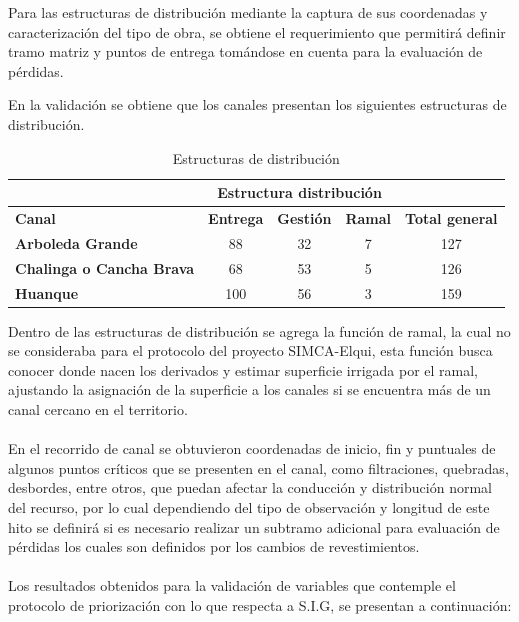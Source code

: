 \documentclass[]{article}
\begin{document}
Para las estructuras de distribución mediante la captura de sus coordenadas y caracterización del tipo de obra, se obtiene el requerimiento que permitirá definir tramo matriz y puntos de entrega tomándose en cuenta para la evaluación de pérdidas. 

En la validación se obtiene que los canales presentan los siguientes estructuras de distribución.

\begin{table}[H]
\centering
\caption{Estructuras de distribución}
\label{my-label}
\begin{tabular}{l|c|c|c|c}
\cline{2-4}
                                                       & \multicolumn{3}{c|}{\textbf{Estructura distribución}} & \multicolumn{1}{l}{}                        \\ \hline
\multicolumn{1}{|l|}{\textbf{Canal}}                   & \textbf{Entrega}  & \textbf{Gestión} & \textbf{Ramal} & \multicolumn{1}{c|}{\textbf{Total general}} \\ \hline
\multicolumn{1}{|l|}{\textbf{Arboleda Grande}}         & 88                & 32               & 7              & \multicolumn{1}{c|}{127}                    \\ \hline
\multicolumn{1}{|l|}{\textbf{Chalinga o Cancha Brava}} & 68                & 53               & 5              & \multicolumn{1}{c|}{126}                    \\ \hline
\multicolumn{1}{|l|}{\textbf{Huanque}}                 & 100               & 56               & 3              & \multicolumn{1}{c|}{159}                    \\ \hline
\end{tabular}
\end{table}

Dentro de las estructuras de distribución se agrega la función de ramal, la cual no se consideraba para el protocolo del proyecto SIMCA-Elqui, esta función busca conocer donde nacen los derivados y estimar superficie irrigada por el ramal, ajustando la asignación de la superficie a los canales si se encuentra más de un canal cercano en el territorio.\\
\\
En el recorrido de canal se obtuvieron coordenadas de inicio, fin y puntuales de algunos puntos críticos que se presenten en el canal, como filtraciones, quebradas, desbordes, entre otros, que puedan afectar la conducción y distribución normal del recurso, por lo cual dependiendo del tipo de observación y longitud de este hito se definirá si es necesario realizar un subtramo adicional para evaluación de pérdidas los cuales son definidos por los cambios de revestimientos.\\
\\
Los resultados obtenidos para la validación de variables que contemple el protocolo de priorización con lo que respecta a S.I.G, se presentan a continuación: 
\end{document}
